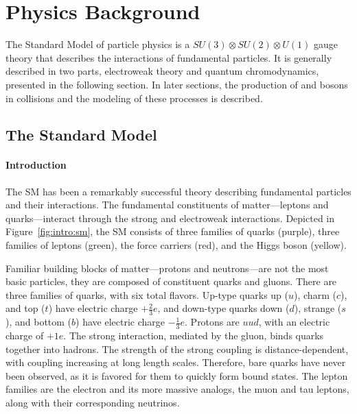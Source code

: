 \chapter{Physics Background}\label{ch:sm}
The Standard Model of particle physics is a $SU(3)\otimes SU(2)\otimes U(1)$ gauge theory that describes the interactions of fundamental particles. It is generally described in two parts, electroweak theory and quantum chromodynamics, presented in the following section. In later sections, the production of \W and \Z bosons in \pp collisions and the modeling of these processes is described. 



\section{The Standard Model}\label{ch:sm:sm}
\subsubsection{Introduction}
The SM has been a remarkably successful theory describing fundamental particles and their interactions. The fundamental constituents of matter---leptons and quarks---interact through the strong and electroweak interactions. Depicted in Figure~\ref{fig:intro:sm}, the SM consists of three families of quarks (purple), three families of leptons (green), the force carriers (red), and the Higgs boson (yellow). 



Familiar building blocks of matter---protons and neutrons---are not the most basic particles, they are composed of constituent quarks and gluons. There are three families of quarks, with six total flavors. Up-type quarks up ($u$), charm ($c$), and top ($t$) have electric charge $+\frac{2}{3} e$, and down-type quarks down ($d$), strange ($s$), and bottom ($b$) have electric charge $-\frac{1}{3}e$. Protons are $uud$, with an electric charge of $+1e$. The strong interaction, mediated by the gluon, binds quarks together into hadrons. The strength of the strong coupling is distance-dependent, with coupling increasing at long length scales. Therefore, bare quarks have never been observed, as it is favored for them to quickly form bound states. The lepton families are the electron and its more massive analogs, the muon and tau leptons, along with their corresponding neutrinos. 

